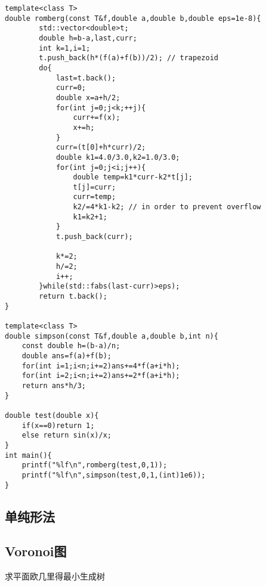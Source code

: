 \documentclass{article}
\begin{document}
\begin{lstlisting}
template<class T>
double romberg(const T&f,double a,double b,double eps=1e-8){
        std::vector<double>t;
        double h=b-a,last,curr;
        int k=1,i=1;
        t.push_back(h*(f(a)+f(b))/2); // trapezoid
        do{
            last=t.back();
            curr=0;
            double x=a+h/2;
            for(int j=0;j<k;++j){
                curr+=f(x);
                x+=h;
            }
            curr=(t[0]+h*curr)/2;
            double k1=4.0/3.0,k2=1.0/3.0;
            for(int j=0;j<i;j++){
                double temp=k1*curr-k2*t[j];
                t[j]=curr;
                curr=temp;
                k2/=4*k1-k2; // in order to prevent overflow
                k1=k2+1;
            }
            t.push_back(curr);

            k*=2;
            h/=2;
            i++;
        }while(std::fabs(last-curr)>eps);
        return t.back();
}

template<class T>
double simpson(const T&f,double a,double b,int n){
    const double h=(b-a)/n;
    double ans=f(a)+f(b);
    for(int i=1;i<n;i+=2)ans+=4*f(a+i*h);
    for(int i=2;i<n;i+=2)ans+=2*f(a+i*h);
    return ans*h/3;
}

double test(double x){
    if(x==0)return 1;
    else return sin(x)/x;
}
int main(){
    printf("%lf\n",romberg(test,0,1));
    printf("%lf\n",simpson(test,0,1,(int)1e6));
}
\end{lstlisting}

\subsection{单纯形法}

\subsection{Voronoi图}

求平面欧几里得最小生成树
\end{document}
